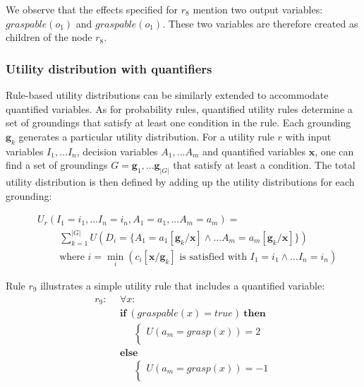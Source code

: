 We observe that the effects specified for $r_8$ mention two output variables: $\mathit{graspable}(o_1)$ and $\mathit{graspable}(o_1)$.  These two variables are therefore created as children of the node $r_8$. 

\subsubsection*{Utility distribution with quantifiers}

Rule-based utility distributions can be similarly extended to accommodate quantified variables. As for probability rules, quantified utility rules determine a set of groundings that satisfy at least one condition in the rule.  Each grounding $\mathbf{g}_k$ generates a particular utility distribution.  For a utility rule $r$ with input variables $I_1,...I_n$, decision variables $A_1,...A_m$ and quantified variables $\mathbf{x}$, one can find a set of groundings $G= \mathbf{g}_1,...\mathbf{g}_{|G|}$ that satisfy at least a condition. The total utility distribution is then defined by adding up the utility distributions for each grounding:

\begin{align}
& U_{r}(I_1\!=\!i_1,... I_n\!=\!i_n, A_1\!=\!a_1,... A_m\!=\!a_m) = \nonumber \\ 
&  \; \; \; \; \; \; \; \;  \sum_{k=1}^{|G|} U(D_i = \{A_1\!=\!a_1[\mathbf{g}_k / \mathbf{x}] \land... A_m\!=\!a_m[\mathbf{g}_k / \mathbf{x}]\}) \label{eq:quantifruledistrib}
 \\
& \; \; \; \; \; \; \; \; \text{where } i = \min_i (c_i[\mathbf{x} / \mathbf{g}_k]\text{ is satisfied with } I_1\!=\!i_1 \land ... I_n\!=\!i_n) \nonumber
\end{align}

Rule $r_9$ illustrates a simple utility rule that includes a quantified variable:
\begin{align*}
r_9: \ \ & \forall x: \\ 
& \textbf{if} \ (\mathit{graspable}(x) = \mathit{true})  \ \textbf{then} \\ 
& \;\;\;\;\; \begin{cases}
U(a_m\!=\!\mathit{grasp}(x)) = 2 \\
\end{cases} \\ 
&\textbf{else} \\ 
& \;\;\;\;\; \begin{cases}
U(a_m\!=\!\mathit{grasp}(x)) = -1 \\
\end{cases}
\end{align*}

